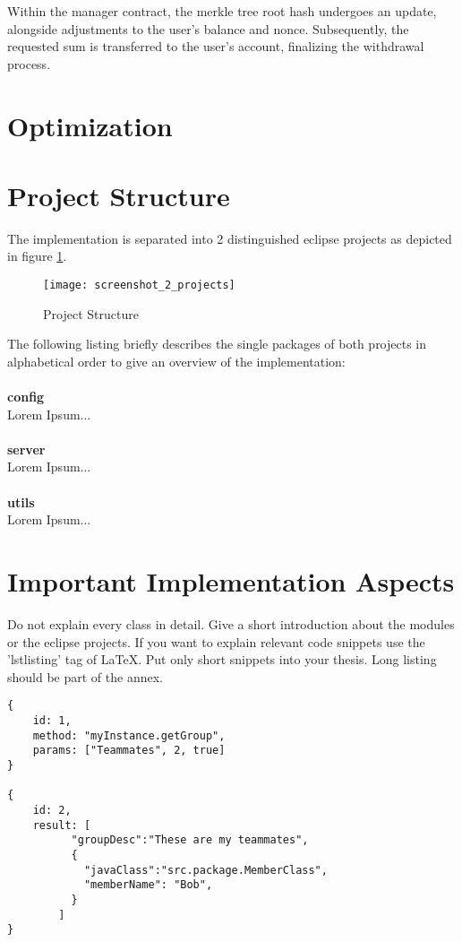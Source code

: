   Within the manager contract, the merkle tree root hash undergoes an update, alongside adjustments to the user's balance and nonce. Subsequently, the requested sum is transferred to the user's account, finalizing the withdrawal process.
  


\section{Optimization}

\section{Project Structure\label{sec:projectstructure}}

The implementation is separated into 2 distinguished eclipse projects as depicted in figure \ref{fig:projects}.

\begin{figure}[htb]
  \centering
  \texttt{[image: screenshot\_2\_projects]}
  \caption{Project Structure}
  \label{fig:projects}
\end{figure}

\noindent
The following listing briefly describes the single packages of both projects in alphabetical order to give an overview of the implementation:
\\
\\
\textbf{config} 
\\
Lorem Ipsum...
\\
\\
\textbf{server} 
\\
Lorem Ipsum...
\\
\\
\textbf{utils} 
\\
Lorem Ipsum...

\section{Important Implementation Aspects\label{sec:implaspects}}

Do not explain every class in detail. Give a short introduction about the modules or the eclipse projects. If you want to explain relevant code snippets use the 'lstlisting' tag of LaTeX. Put only short snippets into your thesis. Long listing should be part of the annex.

\lstset{caption=JSON String Code Snippet,label=jsonstring,showstringspaces=false}
\begin{lstlisting}
{
	id: 1,
	method: "myInstance.getGroup",
	params: ["Teammates", 2, true]
}

{
	id: 2,
	result: [
		  "groupDesc":"These are my teammates",
		  {
			"javaClass":"src.package.MemberClass",
			"memberName": "Bob",      
		  }
		]
}\end{lstlisting}

